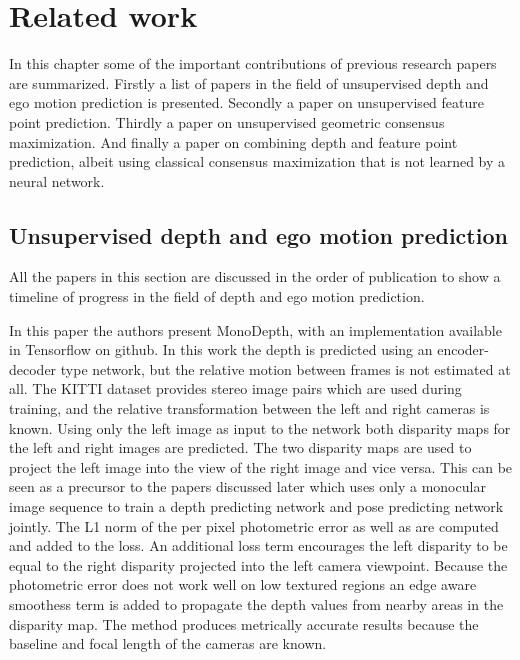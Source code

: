 \chapter{Related work}\label{cha:relatedwork}


In this chapter some of the important contributions of previous research papers are summarized. Firstly a list of papers in the field of unsupervised depth and ego motion prediction is presented. Secondly a paper on unsupervised feature point prediction. Thirdly a paper on unsupervised geometric consensus maximization. And finally a paper on combining depth and feature point prediction, albeit using classical consensus maximization that is not learned by a neural network.

\section{Unsupervised depth and ego motion prediction}

All the papers in this section are discussed in the order of publication to show a timeline of progress in the field of depth and ego motion prediction.


In this paper\cite{leftright} the authors present MonoDepth, with an implementation available in Tensorflow on github. In this work the depth is predicted using an encoder-decoder type network, but the relative motion between frames is not estimated at all. The KITTI dataset provides stereo image pairs which are used during training, and the relative transformation between the left and right cameras is known. Using only the left image as input to the network both disparity maps for the left and right images are predicted. The two disparity maps are used to project the left image into the view of the right image and vice versa. This can be seen as a precursor to the papers discussed later which uses only a monocular image sequence to train a depth predicting network and pose predicting network jointly. The L1 norm of the per pixel photometric error as well as \abbrSSIM\cite{ssim} are computed and added to the loss. An additional loss term encourages the left disparity to be equal to the right disparity projected into the left camera viewpoint. Because the photometric error does not work well on low textured regions an edge aware smoothess term is added to propagate the depth values from nearby areas in the disparity map. The method produces metrically accurate results because the baseline and focal length of the cameras are known.

